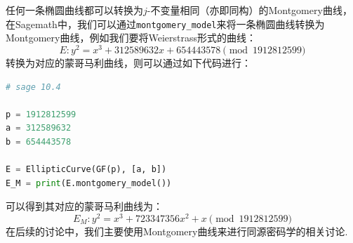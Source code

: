 \documentclass{book}
\numberwithin{equation}{subsubsection}
\begin{document}
任何一条椭圆曲线都可以转换为$j$-不变量相同（亦即同构）的Montgomery曲线，在Sagemath中，我们可以通过\texttt{montgomery\_model}来将一条椭圆曲线转换为Montgomery曲线，例如我们要将Weierstrass形式的曲线：
\begin{equation}
    E:y^2=x^3+312589632x+654443578\pmod{1912812599}
    \nonumber
\end{equation}
转换为对应的蒙哥马利曲线，则可以通过如下代码进行：
\begin{lstlisting}[language=Python,basicstyle=\ttfamily,breaklines=true,keywordstyle=\bfseries\color{blue}]
# sage 10.4

p = 1912812599
a = 312589632
b = 654443578

E = EllipticCurve(GF(p), [a, b])
E_M = print(E.montgomery_model())
\end{lstlisting}
可以得到其对应的蒙哥马利曲线为：
\begin{equation}
    E_M:y^2 = x^3 + 723347356x^2 + x\pmod{1912812599}
    \nonumber
\end{equation}
在后续的讨论中，我们主要使用Montgomery曲线来进行同源密码学的相关讨论.
\end{document}
